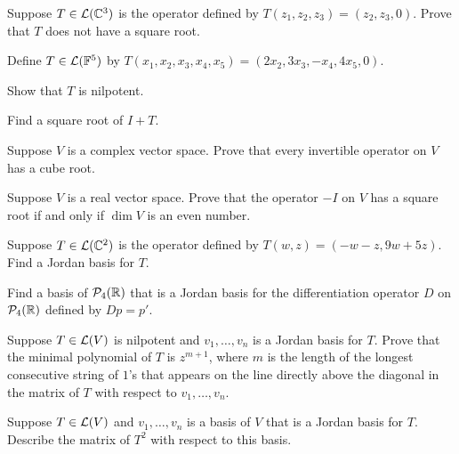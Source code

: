 \begin{exc}

\begin{exercise}
Suppose $T\in\mathcal{L}(\mathbb{C}^3)$ is the operator defined by
$T(z_1,z_2,z_3)=(z_2,z_3,0)$. Prove that $T$ does not have a square root.
\end{exercise}

\begin{exercise}
Define $T\in\mathcal{L}(\mathbb{F}^5)$ by
$T(x_1,x_2,x_3,x_4,x_5)=(2x_2,3x_3,-x_4,4x_5,0)$.
\begin{parts}
\item Show that $T$ is nilpotent.
\item Find a square root of $I+T$.
\end{parts}
\end{exercise}

\begin{exercise}
Suppose $V$ is a complex vector space. Prove that every invertible operator on
$V$ has a cube root.
\end{exercise}

\begin{exercise}
Suppose $V$ is a real vector space. Prove that the operator $-I$ on $V$ has a
square root if and only if $\dim V$ is an even number.
\end{exercise}

\begin{exercise}
Suppose $T\in\mathcal{L}(\mathbb{C}^2)$ is the operator defined by $T(w,z)=(-w-z,9w+5z)$.
Find a Jordan basis for $T$.
\end{exercise}

\begin{exercise}
Find a basis of $\mathcal{P}_4(\mathbb{R})$ that is a Jordan basis for the differentiation
operator $D$ on $\mathcal{P}_4(\mathbb{R})$ defined by $Dp=p'$.
\end{exercise}

\begin{exercise}
Suppose $T\in\mathcal{L}(V)$ is nilpotent and $v_1,\dots,v_n$ is a Jordan basis for
$T$. Prove that the minimal polynomial of $T$ is $z^{m+1}$, where $m$ is the
length of the longest consecutive string of $1$'s that appears on the line
directly above the diagonal in the matrix of $T$ with respect to
$v_1,\dots,v_n$.
\end{exercise}

\begin{exercise}
Suppose $T\in\mathcal{L}(V)$ and $v_1,\dots,v_n$ is a basis of $V$ that is a Jordan
basis for $T$. Describe the matrix of $T^2$ with respect to this basis.
\end{exercise}


\end{exc}
